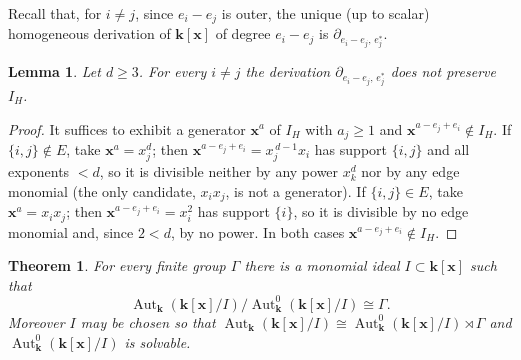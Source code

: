 \documentclass[11pt,letterpaper,reqno]{amsart}
\newtheorem{theorem}{Theorem}[section]
\newtheorem{lemma}[lemma]{Lemma}
\theoremstyle{remark}
\theoremstyle{definition}
\def\XX{\mathbf{x}}
\newcommand{\KK}[0]{\ensuremath{\mathbf{k}}}
\newcommand{\Aut}[0]{\ensuremath{\operatorname{Aut}}}
\begin{document}
Recall that, for $i\neq j$, since $e_i-e_j$ is outer, the unique (up to scalar) homogeneous derivation of $\KK[\XX]$ of degree $e_i-e_j$ is $\partial_{e_i-e_j,\,e_j^*}$.

\begin{lemma}\label{lem:no-bidir}
Let $d\geq3$. For every $i\neq j$ the derivation $\partial_{e_i-e_j,\,e_j^*}$ does not preserve $I_H$.
\end{lemma}

\begin{proof}
It suffices to exhibit a generator $\XX^a$ of
$I_H$ with $a_j\geq1$ and $\XX^{a-e_j+e_i}\notin I_H$. If $\{i,j\}\notin E$, take
$\XX^a=x_j^d$; then $\XX^{a-e_j+e_i}=x_j^{\,d-1}x_i$ has support $\{i,j\}$ and all
exponents $<d$, so it is divisible neither by any power $x_k^d$ nor by any edge
monomial (the only candidate, $x_ix_j$, is not a generator). If $\{i,j\}\in E$,
take $\XX^a=x_ix_j$; then $\XX^{a-e_j+e_i}=x_i^2$ has support $\{i\}$, so it is
divisible by no edge monomial and, since $2<d$, by no power. In both cases
$\XX^{a-e_j+e_i}\notin I_H$.
\end{proof}

\begin{theorem}\label{thm:realize-fin}
For every finite group $\Gamma$ there is a monomial ideal
$I\subset\KK[\XX]$ such that
$$
\Aut_\KK(\KK[\XX]/I)\big/\Aut^0_\KK(\KK[\XX]/I)\cong\Gamma.
$$
Moreover $I$ may be chosen so that
$\Aut_\KK(\KK[\XX]/I)\cong\Aut^0_\KK(\KK[\XX]/I)\rtimes\Gamma$ and
$\Aut^0_\KK(\KK[\XX]/I)$ is solvable.
\end{theorem}
\end{document}
